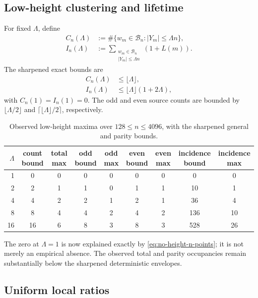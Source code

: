 \documentclass[11pt]{article}
\theoremstyle{definition}
\theoremstyle{remark}
\newcommand{\1}{\mathbf{1}}
\begin{document}
\subsection{Low-height clustering and lifetime}

For fixed $\Lambda$, define
\begin{align}
 C_n(\Lambda)
 &:={\#}\{w_m\in\mathscr B_n:|Y_m|\le\Lambda n\},
 \label{eq:C-lambda}\\
 I_n(\Lambda)
 &:={\sum}_{\substack{w_m\in\mathscr B_n\\|Y_m|\le\Lambda n}}
 (1+L(m)).
 \label{eq:I-lambda}
\end{align}
The sharpened exact bounds are
\begin{align}
 C_n(\Lambda)&\le\lfloor\Lambda\rfloor,
 \label{eq:C-pass}\\
 I_n(\Lambda)&\le\lfloor\Lambda\rfloor(1+2\Lambda),
 \label{eq:I-pass}
\end{align}
with $C_n(1)=I_n(1)=0$.  The odd and even source counts are bounded by
$\lfloor\Lambda/2\rfloor$ and
$\lceil\lfloor\Lambda\rfloor/2\rceil$, respectively.

\begin{table}[htbp]
\centering
\caption{Observed low-height maxima over $128\le n\le4096$, with the
sharpened general and parity bounds.}
\label{tab:low-height-numerical}
\scriptsize
\setlength{\tabcolsep}{3.5pt}
\begin{tabular}{rcccccccc}
\toprule
$\Lambda$ &
count bound & total max &
odd bound & odd max &
even bound & even max &
incidence bound & incidence max\\
\midrule
1  & 0  & 0 & 0 & 0 & 0 & 0 & 0   & 0\\
2  & 2  & 1 & 1 & 0 & 1 & 1 & 10  & 1\\
4  & 4  & 2 & 2 & 1 & 2 & 1 & 36  & 4\\
8  & 8  & 4 & 4 & 2 & 4 & 2 & 136 & 10\\
16 & 16 & 6 & 8 & 3 & 8 & 3 & 528 & 26\\
\bottomrule
\end{tabular}
\end{table}

The zero at $\Lambda=1$ is now explained exactly by
\cref{eq:no-height-n-points}; it is not merely an empirical absence.
The observed total and parity occupancies remain substantially below
the sharpened deterministic envelopes.

\subsection{Uniform local ratios}
\end{document}
